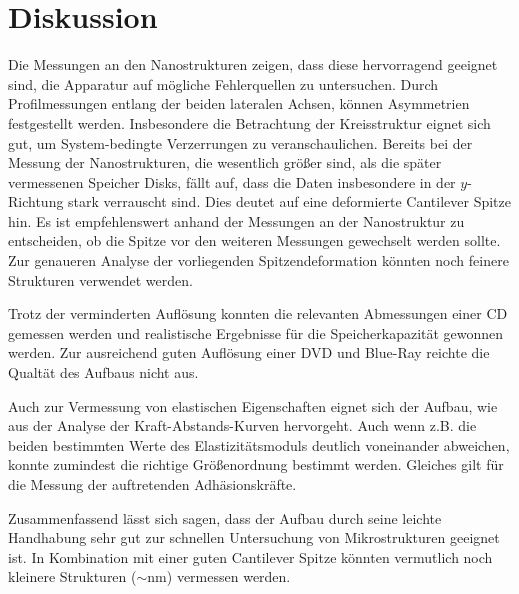 \newpage
\section{Diskussion}
Die Messungen an den Nanostrukturen zeigen, dass diese hervorragend geeignet sind, die Apparatur auf
mögliche Fehlerquellen zu untersuchen. Durch Profilmessungen entlang der beiden lateralen Achsen,
können Asymmetrien festgestellt werden. Insbesondere die Betrachtung der Kreisstruktur eignet sich
gut, um System-bedingte Verzerrungen zu veranschaulichen. Bereits bei der Messung der Nanostrukturen,
die wesentlich größer sind, als die später vermessenen Speicher Disks, fällt auf, dass die
Daten insbesondere in der $y$-Richtung stark verrauscht sind. Dies deutet auf eine deformierte
Cantilever Spitze hin. Es ist empfehlenswert anhand der Messungen an der Nanostruktur zu entscheiden,
ob die Spitze vor den weiteren Messungen gewechselt werden sollte. Zur genaueren Analyse der vorliegenden
Spitzendeformation könnten noch feinere Strukturen verwendet werden.

Trotz der verminderten Auflösung konnten die relevanten Abmessungen einer CD gemessen werden und realistische
Ergebnisse für die Speicherkapazität gewonnen werden. Zur ausreichend guten Auflösung einer
DVD und Blue-Ray reichte die Qualtät des Aufbaus nicht aus.

Auch zur Vermessung von elastischen Eigenschaften eignet sich der Aufbau, wie aus der Analyse der
Kraft-Abstands-Kurven hervorgeht. Auch wenn z.B. die beiden bestimmten Werte des Elastizitätsmoduls
deutlich voneinander abweichen, konnte zumindest die richtige Größenordnung bestimmt werden. Gleiches gilt
für die Messung der auftretenden Adhäsionskräfte.

Zusammenfassend lässt sich sagen, dass der Aufbau durch seine leichte Handhabung sehr gut zur schnellen
Untersuchung von Mikrostrukturen geeignet ist. In Kombination
mit einer guten Cantilever Spitze könnten vermutlich noch kleinere Strukturen ($\sim \si{\nano\meter}$) vermessen werden.
